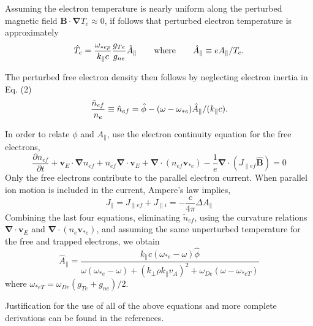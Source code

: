 Assuming the electron temperature is nearly uniform along
the perturbed magnetic field 
$ {\mathbf B} \cdot {\mathbf \nabla} T_e \approx 0 $,
if follows that perturbed electron temperature is approximately
\begin{equation}
 \hat{T}_e = 
   \frac{ \omega_{*ep} }{ k_{\parallel} c }
   \frac{ g_{Te} }{  g_{ne} }
      \hat{A}_{\parallel}
\qquad{\rm where}\qquad  \hat{A}_\parallel \equiv e A_\parallel / T_e .
\end{equation}

The perturbed free electron density then follows by neglecting electron
inertia in Eq. (2)
\begin{equation}
{{\tilde{n}_{ef}}\over n_e}\equiv \hat{n}_{ef} =
   \hat{\phi} - ( \omega - \omega_{*e} ) \hat{A}_\parallel
    / ( k_\parallel c ).
\end{equation}

In order to relate $\phi$ and $A_{\parallel}$, use the 
electron continuity equation for the free electrons,
\begin{equation}
\frac{\partial n_{ef}}{\partial t}  + 
  {\mathbf v}_{E}\cdot{\mathbf \nabla} n_{ef} 
  + n_{ef}{\mathbf \nabla}\cdot{\mathbf v}_{E} 
   +  {\mathbf \nabla}\cdot \left( n_{ef} {\mathbf v}_{*e} \right) 
  - \frac{1}{e}{\mathbf \nabla}\cdot
   \left( J_{\parallel ef}\hat{{\mathbf B}} \right)
   = 0
\end{equation}
Only the free electrons contribute to the parallel electron current.
When parallel ion motion is included in the current,
Ampere's law implies,
\begin{equation}
J_{\parallel} = J_{\parallel ef} + J_{\parallel i} = - \frac{c}{4 \pi}
   \Delta A_{\parallel}
\end{equation}
Combining the last four equations,
eliminating $\tilde{n}_{ef}$, using the curvature relations
${\mathbf \nabla} \cdot {\mathbf v}_E$ and
 ${\mathbf \nabla} \cdot \left( n_e {\mathbf v}_{*e} \right)$,
and assuming the same unperturbed temperature for the free and trapped
electrons, we obtain
\begin{equation}
\hat{A}_{\parallel}
 = \frac{k_{\parallel} c \left( \omega_{*e} - \omega \right) \hat{\phi}}
{ \omega \left( \omega_{*e} - \omega \right)
   + \left( k_{\perp} \rho k_{\parallel} v_{A} \right)^2
   + \omega_{De} \left( \omega - \omega_{*eT} \right) }
\end{equation}
where $\omega_{*eT} = \omega_{De} ( g_{Te} + g_{ne} ) / 2 $.

Justification for the use of all of the above equations 
and more complete derivations
can be found in the references.\cite{weil92a,nord90a}

